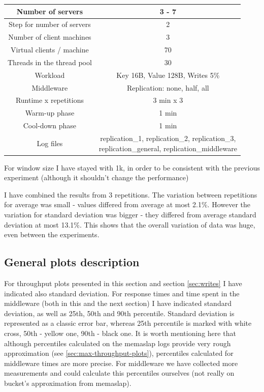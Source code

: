 \documentclass[11pt]{article}
\begin{document}
{\small
\smallskip
\begin{tabular}{|c|c|}
\hline Number of servers & 3 - 7 \\ 
\hline Step for number of servers & 2 \\
\hline Number of client machines & 3 \\ 
\hline Virtual clients / machine &  70 \\ 
\hline Threads in the thread pool & 30 \\
\hline Workload & Key 16B, Value 128B, Writes 5\% \\
\hline Middleware & Replication: none, half, all \\ 
\hline Runtime x repetitions & 3 min x 3 \\
\hline Warm-up phase & 1 min \\
\hline Cool-down phase & 1 min \\
\hline Log files & \parbox[t]{10cm}{replication\_1, replication\_2, replication\_3, \\replication\_general, replication\_middleware} \\[3.4ex]
\hline 
\end{tabular} }
\medskip

For window size I have stayed with 1k, in order to be consistent with the previous experiment (although it shouldn't change the performance)

I have combined the results from 3 repetitions. The variation between repetitions for average was small - values differed from average at most 2.1\%. However the variation for standard deviation was bigger - they differed from average standard deviation at most 13.1\%.  This shows that the overall variation of data was huge, even between the experiments.

\subsection{General plots description}
For throughput plots presented in this section and section \ref{sec:writes} I have indicated also standard deviation. For response times and time spent in the middleware (both in this and the next section) I have indicated standard deviation, as well as 25th, 50th and 90th percentile. Standard deviation is represented as a classic error bar, whereas 25th percentile is marked with white cross, 50th - yellow one, 90th - black one. It is worth mentioning here that although percentiles calculated on the memaslap logs provide very rough approximation (see \ref{sec:max-throughput-plots}), percentiles calculated for middleware times are more precise. For middleware we have collected more measurements and could calculate this percentiles ourselves (not really on bucket's approximation from memaslap).
\end{document}
